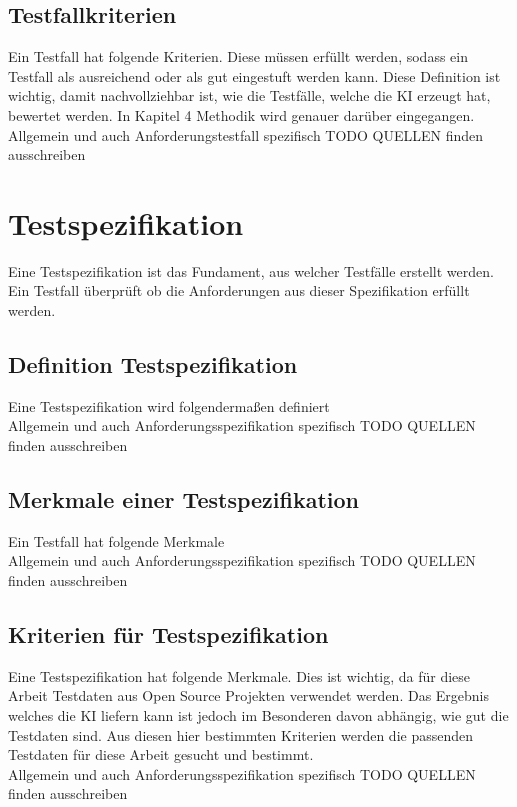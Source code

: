 \documentclass[12pt,toc=bib,toc=listof]{scrreprt}
\begin{document}
\subsection{Testfallkriterien} %
\label{sec:testfallkriterien}
Ein Testfall hat folgende Kriterien. Diese müssen erfüllt werden, sodass ein Testfall als ausreichend oder als gut eingestuft werden kann. Diese Definition ist wichtig, damit nachvollziehbar ist, wie die Testfälle, welche die KI erzeugt hat, bewertet werden. In Kapitel 4 Methodik wird genauer darüber eingegangen.\\
Allgemein und auch Anforderungstestfall spezifisch
TODO QUELLEN finden ausschreiben

\section{Testspezifikation} %
\label{sec:testspezifikation}
Eine Testspezifikation ist das Fundament, aus welcher Testfälle erstellt werden. Ein Testfall überprüft ob die Anforderungen aus dieser Spezifikation erfüllt werden.

\subsection{Definition Testspezifikation} %
\label{sec:definitionTestspezifikation}
Eine Testspezifikation wird folgendermaßen definiert\\
Allgemein und auch Anforderungsspezifikation spezifisch
TODO QUELLEN finden ausschreiben

\subsection{Merkmale einer Testspezifikation} %
\label{sec:merkmaleEinerTestspezifikation}
Ein Testfall hat folgende Merkmale\\
Allgemein und auch Anforderungsspezifikation spezifisch
TODO QUELLEN finden ausschreiben

\subsection{Kriterien für Testspezifikation} %
\label{sec:kriterienFürTestspezifikation}
Eine Testspezifikation hat folgende Merkmale. Dies ist wichtig, da für diese Arbeit Testdaten aus Open Source Projekten verwendet werden. Das Ergebnis welches die KI liefern kann ist jedoch im Besonderen davon abhängig, wie gut die Testdaten sind. Aus diesen hier bestimmten Kriterien werden die passenden Testdaten für diese Arbeit gesucht und bestimmt.\\
Allgemein und auch Anforderungsspezifikation spezifisch
TODO QUELLEN finden ausschreiben
\end{document}
